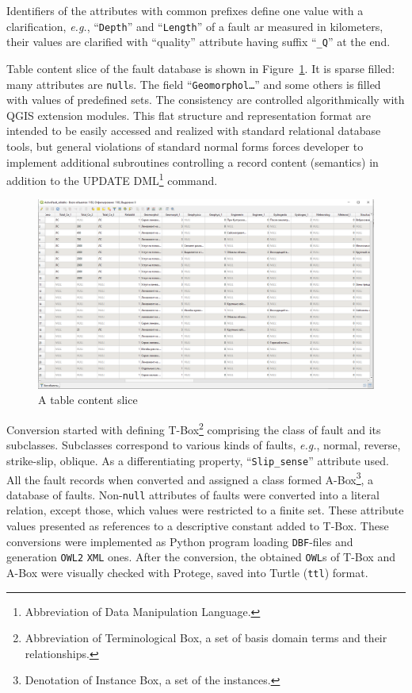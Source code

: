 \documentclass[
]{ceurart}
\begin{document}
  Identifiers of the attributes with common prefixes define one value with a clarification, \emph{e.g.}, ``\texttt{Depth}'' and ``\texttt{Length}'' of a fault ar measured in kilometers, their values are clarified with ``quality'' attribute having suffix ``\texttt{\_Q}'' at the end.

  Table content slice of the fault database is shown in Figure~\ref{fig:db-slice}.  It is sparse filled: many attributes are \texttt{null}s.  The field ``\texttt{Geomorphol\ldots}'' and some others is filled with values of predefined sets.  The consistency are controlled algorithmically with QGIS extension modules.  This flat structure and representation format are intended to be easily accessed and realized with standard relational database tools, but general violations of standard normal forms forces developer to implement additional subroutines controlling a record content (semantics) in addition to the UPDATE DML\footnote{Abbreviation of Data Manipulation Language.} command.

  \begin{figure}
    \centering
\includegraphics[width=\linewidth]{faults-leaflet-db-content.png}
    \caption{A table content slice}
    \label{fig:db-slice}
  \end{figure}

Conversion started with defining T-Box\footnote{Abbreviation of Terminological Box, a set of basis domain terms and their relationships.} comprising the class of fault and its subclasses.  Subclasses correspond to various kinds of faults, \emph{e.g.}, normal, reverse, strike-slip, oblique.  As a differentiating property, ``\texttt{Slip\_sense}'' attribute used.  All the fault records when converted and assigned a class formed A-Box\footnote{Denotation of Instance Box, a set of the instances.}, a database of faults.  Non-\texttt{null} attributes of faults were converted into a literal relation, except those, which values were restricted to a finite set.  These attribute values presented as references to a descriptive constant added to T-Box.  These conversions were implemented as Python program loading \texttt{DBF}-files and generation \texttt{OWL2} \texttt{XML} ones.  After the conversion, the obtained \texttt{OWL}s of T-Box and A-Box were visually checked with Protege, saved into Turtle (\texttt{ttl}) format.
\end{document}
